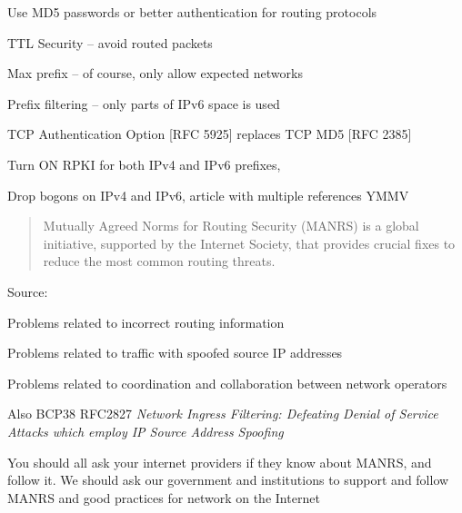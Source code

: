 \documentclass[Screen16to9,17pt]{foils}
\begin{document}


\begin{list2}
\item Use MD5 passwords or better authentication for routing protocols {\myalert}
\item TTL Security -- avoid routed packets
\item Max prefix -- of course, only allow expected networks
\item Prefix filtering -- only parts of IPv6 space is used
\item TCP Authentication Option [RFC 5925] replaces TCP MD5 [RFC 2385]
\item Turn ON RPKI for both IPv4 and IPv6 prefixes, {\myalert} \\
\item Drop bogons on IPv4 and IPv6, article with multiple references YMMV\\
\end{list2}




\begin{quote}
  Mutually Agreed Norms for Routing Security (MANRS) is a global initiative, supported by the Internet Society, that provides crucial fixes to reduce the most common routing threats. ﻿
\end{quote}
Source: {\small{}}

\begin{list2}
\item Problems related to incorrect routing information
\item Problems related to traffic with spoofed source IP addresses
\item Problems related to coordination and collaboration between network operators
\item Also BCP38 RFC2827 \emph{Network Ingress Filtering: Defeating Denial of Service Attacks
which employ IP Source Address Spoofing}
\end{list2}

You should all ask your internet providers if they know about MANRS, and follow it. We should ask our government and institutions to support and follow MANRS and good practices for network on the Internet
\end{document}

